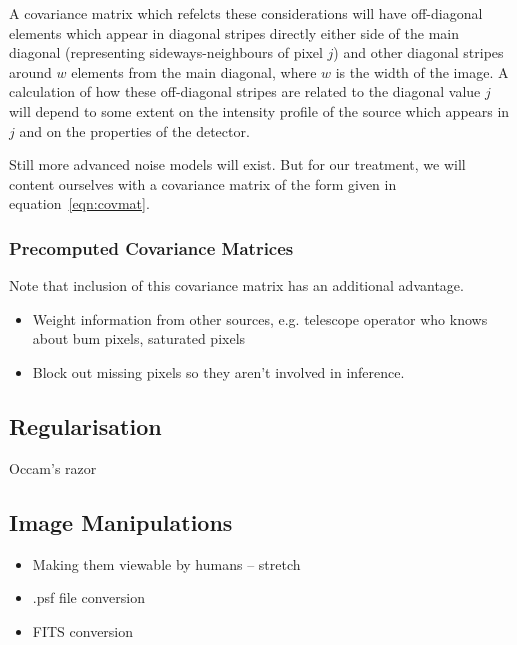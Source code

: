\documentclass[letterpaper, 11pt]{article}
\begin{document}
A covariance matrix which refelcts these considerations will have off-diagonal elements which appear in diagonal stripes directly either side of the main diagonal (representing sideways-neighbours of pixel $j$) and other diagonal stripes around $w$ elements from the main diagonal, where $w$ is the width of the image. A calculation of how these off-diagonal stripes are related to the diagonal value $j$ will depend to some extent on the intensity profile of the source which appears in $j$ and on the properties of the detector. 

Still more advanced noise models will exist. But for our treatment, we will content ourselves with a covariance matrix of the form given in equation~\ref{eqn:covmat}.

\subsubsection{Precomputed Covariance Matrices}

Note that inclusion of this covariance matrix has an additional advantage.
\begin{itemize}
	\item Weight information from other sources, e.g. telescope operator who knows about bum pixels, saturated pixels
	\item Block out missing pixels so they aren't involved in inference.
\end{itemize}


\subsection{Regularisation}
\label{sec:regularisation}


Occam's razor



\subsection{Image Manipulations}

\begin{itemize}
	\item Making them viewable by humans -- stretch
	\item .psf file conversion
	\item FITS conversion
\end{itemize}
\end{document}
